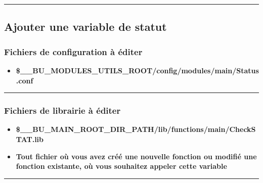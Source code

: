 \documentclass[a4paper,10pt]{article}
\begin{document}



\color{sec2}\par\noindent\rule{\textwidth}{0.4pt}\color{text}

\color{sec2}
\subsection{Ajouter une variable de statut}\color{text}

\color{sec3}
\subsubsection{Fichiers de configuration à éditer}\color{text}

\begin{itemize}
    \item \textbf{\color{vars}\$\_\_BU\_MODULES\_UTILS\_ROOT\color{path}/config/modules/main/Status.conf}\\[1\baselineskip]
\end{itemize}


\color{sec3}\par\noindent\rule{\textwidth}{0.4pt}\color{text}

\color{sec3}
\subsubsection{Fichiers de librairie à éditer}\color{text}

\begin{justify}
    \begin{itemize}
        \item \textbf{\color{vars}\$\_\_BU\_MAIN\_ROOT\_DIR\_PATH\color{path}/lib/functions/main/CheckSTAT.lib}\\\mbox{}

        \item \textbf{Tout fichier où vous avez créé une nouvelle fonction ou modifié une fonction existante, où vous souhaitez appeler cette variable}
    \end{itemize}
\end{justify}


\color{sec3}\par\noindent\rule{\textwidth}{0.4pt}\color{text}
\end{document}
